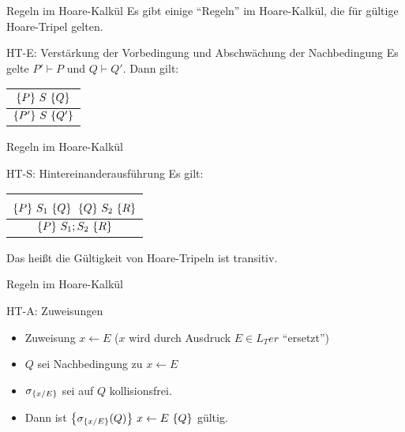 \begin{frame}{Regeln im Hoare-Kalkül}
	Es gibt einige ``Regeln'' im Hoare-Kalkül, die für gültige Hoare-Tripel gelten.

	\begin{block}{HT-E: Verstärkung der Vorbedingung und Abschwächung der Nachbedingung}
		Es gelte $P' \vdash P$ und $Q\vdash Q'$. Dann gilt:
		 \begin{center}\begin{tabular}{c}
						$\left\{ P \right\} \, S \, \left\{ Q \right\}$\\
						\midrule
						$\left\{ P' \right\} \, S \, \left\{ Q' \right\}$
		\end{tabular}\end{center}
	\end{block}

\end{frame}

\begin{frame}{Regeln im Hoare-Kalkül}

	\begin{block}{HT-S: Hintereinanderausführung}
		Es gilt: \begin{center}\begin{tabular}{c}
			$\left\{ P \right\} \, S_1 \, \left\{ Q \right\}$ \qquad $\left\{ Q \right\} \, S_2 \, \left\{ R \right\}$\\
			\midrule
			$\left\{ P \right\} \, S_1 ; S_2 \, \left\{ R \right\}$
		\end{tabular}\end{center}
		Das heißt die Gültigkeit von Hoare-Tripeln ist transitiv. 
		
	\end{block}
\end{frame}

\begin{frame}{Regeln im Hoare-Kalkül}
	\begin{block}{HT-A: Zuweisungen}
		\begin{itemize}
			\item Zuweisung $x \leftarrow E$ ($x$ wird durch Ausdruck $E \in L_Ter$ ``ersetzt'')
			\item $Q$ sei Nachbedingung zu $x \leftarrow E$
			\item $\sigma_{\left\{ x/E \right\}}$ sei auf $Q$ kollisionsfrei.
			\item Dann ist \quad $\left\{ \sigma_{\left\{ x/E \right\}}(Q) \right\} \, x\leftarrow E \, \left\{ Q \right\}$ \quad gültig.
		\end{itemize}
	\end{block}
\end{frame}
